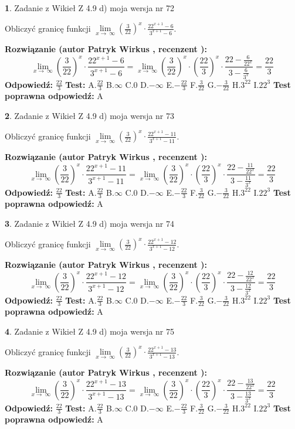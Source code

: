 \documentclass[12pt, a4paper]{article}
\theoremstyle{definition} %
\newtheorem{zad}{}
\newcommand{\zadStart}[1]{\begin{zad}#1\newline}
\newcommand{\zadStop}{\end{zad}}
\newcommand{\rozwStart}[2]{\noindent \textbf{Rozwiązanie (autor #1 , recenzent #2): }\newline}
\newcommand{\rozwStop}{\newline}
\newcommand{\odpStart}{\noindent \textbf{Odpowiedź:}\newline}
\newcommand{\odpStop}{\newline}
\newcommand{\testStart}{\noindent \textbf{Test:}\newline}
\newcommand{\testStop}{\newline}
\newcommand{\kluczStart}{\noindent \textbf{Test poprawna odpowiedź:}\newline}
\newcommand{\kluczStop}{\newline}
\begin{document}
\zadStart{Zadanie z Wikieł Z 4.9 d) moja wersja nr 72}


Obliczyć granicę funkcji  $\lim\limits_{x\to\ \infty}(\frac{3}{22})^{x}\cdot\frac{22^{x+1}-6}{3^{x+1}-6}$.
\zadStop
\rozwStart{Patryk Wirkus}{}
$$\lim\limits_{x\to\ \infty}(\frac{3}{22})^{x}\cdot\frac{22^{x+1}-6}{3^{x+1}-6}=\lim\limits_{x\to\ \infty}(\frac{3}{22})^{x}\cdot(\frac{22}{3})^{x} \cdot \frac{22-\frac{6}{22^{x}}}{3-\frac{6}{3^{x}}} = \frac{22}{3}$$
\rozwStop
\odpStart
$\frac{22}{3}$
\odpStop
\testStart
A.$\frac{22}{3}$ B.$\infty$ C.$0$ D.$-\infty$ E.$-\frac{22}{3}$
F.$\frac{3}{22}$ G.$-\frac{3}{22}$
H.$3^{22}$
I.$22^{3}$
\testStop
\kluczStart
A
\kluczStop



\zadStart{Zadanie z Wikieł Z 4.9 d) moja wersja nr 73}


Obliczyć granicę funkcji  $\lim\limits_{x\to\ \infty}(\frac{3}{22})^{x}\cdot\frac{22^{x+1}-11}{3^{x+1}-11}$.
\zadStop
\rozwStart{Patryk Wirkus}{}
$$\lim\limits_{x\to\ \infty}(\frac{3}{22})^{x}\cdot\frac{22^{x+1}-11}{3^{x+1}-11}=\lim\limits_{x\to\ \infty}(\frac{3}{22})^{x}\cdot(\frac{22}{3})^{x} \cdot \frac{22-\frac{11}{22^{x}}}{3-\frac{11}{3^{x}}} = \frac{22}{3}$$
\rozwStop
\odpStart
$\frac{22}{3}$
\odpStop
\testStart
A.$\frac{22}{3}$ B.$\infty$ C.$0$ D.$-\infty$ E.$-\frac{22}{3}$
F.$\frac{3}{22}$ G.$-\frac{3}{22}$
H.$3^{22}$
I.$22^{3}$
\testStop
\kluczStart
A
\kluczStop



\zadStart{Zadanie z Wikieł Z 4.9 d) moja wersja nr 74}


Obliczyć granicę funkcji  $\lim\limits_{x\to\ \infty}(\frac{3}{22})^{x}\cdot\frac{22^{x+1}-12}{3^{x+1}-12}$.
\zadStop
\rozwStart{Patryk Wirkus}{}
$$\lim\limits_{x\to\ \infty}(\frac{3}{22})^{x}\cdot\frac{22^{x+1}-12}{3^{x+1}-12}=\lim\limits_{x\to\ \infty}(\frac{3}{22})^{x}\cdot(\frac{22}{3})^{x} \cdot \frac{22-\frac{12}{22^{x}}}{3-\frac{12}{3^{x}}} = \frac{22}{3}$$
\rozwStop
\odpStart
$\frac{22}{3}$
\odpStop
\testStart
A.$\frac{22}{3}$ B.$\infty$ C.$0$ D.$-\infty$ E.$-\frac{22}{3}$
F.$\frac{3}{22}$ G.$-\frac{3}{22}$
H.$3^{22}$
I.$22^{3}$
\testStop
\kluczStart
A
\kluczStop



\zadStart{Zadanie z Wikieł Z 4.9 d) moja wersja nr 75}


Obliczyć granicę funkcji  $\lim\limits_{x\to\ \infty}(\frac{3}{22})^{x}\cdot\frac{22^{x+1}-13}{3^{x+1}-13}$.
\zadStop
\rozwStart{Patryk Wirkus}{}
$$\lim\limits_{x\to\ \infty}(\frac{3}{22})^{x}\cdot\frac{22^{x+1}-13}{3^{x+1}-13}=\lim\limits_{x\to\ \infty}(\frac{3}{22})^{x}\cdot(\frac{22}{3})^{x} \cdot \frac{22-\frac{13}{22^{x}}}{3-\frac{13}{3^{x}}} = \frac{22}{3}$$
\rozwStop
\odpStart
$\frac{22}{3}$
\odpStop
\testStart
A.$\frac{22}{3}$ B.$\infty$ C.$0$ D.$-\infty$ E.$-\frac{22}{3}$
F.$\frac{3}{22}$ G.$-\frac{3}{22}$
H.$3^{22}$
I.$22^{3}$
\testStop
\kluczStart
A
\kluczStop
\end{document}
